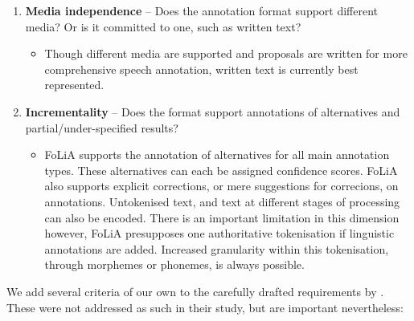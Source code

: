 \documentclass[a4paper,10pt,twoside]{article}
\begin{document}
\begin{enumerate}
\begin{itemize}
  \end{itemize}
\item \textbf{Media independence} -- Does the annotation format support
  different media? Or is it committed to one, such as written text?
  \begin{itemize}
    \item[] Though different media are supported and proposals are written
      for more comprehensive speech annotation, written text is currently best
      represented. 
   \end{itemize}
\item \textbf{Incrementality} -- Does the format support annotations of
  alternatives and partial/under-specified results? 
   \begin{itemize} 
     \item[] FoLiA supports the annotation of alternatives for all
    main annotation types. These alternatives can each be assigned confidence
    scores. FoLiA also supports explicit corrections, or mere suggestions for
    correcions, on annotations.
    Untokenised text, and text at different stages of processing can also be
    encoded. There is an important limitation in this dimension however, FoLiA
    presupposes one authoritative tokenisation if linguistic annotations are
    added. Increased granularity within this tokenisation, through morphemes or
    phonemes, is always possible.
  \end{itemize}
   \setcounter{enumTemp}{\theenumi}
\end{enumerate}

We add several criteria of our own to the carefully drafted requirements by
. These were not addressed as such in their study, but are
important nevertheless:
\end{document}
